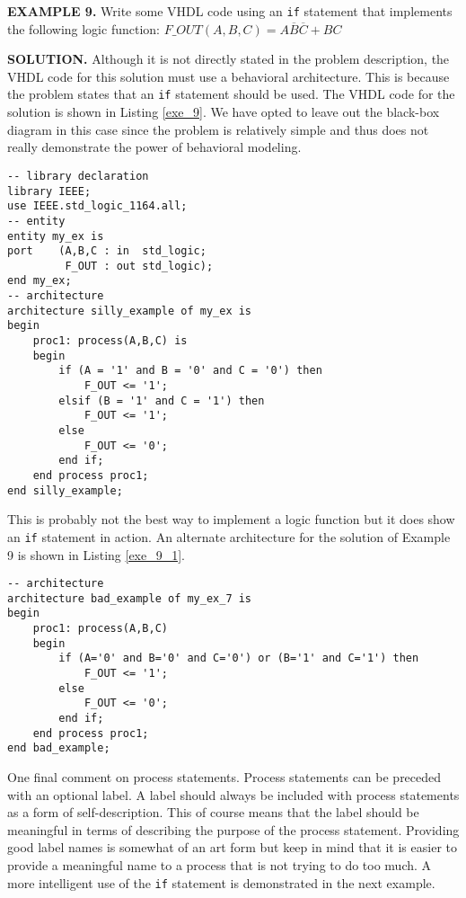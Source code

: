 \begin{leftbar}
\noindent
\textbf{EXAMPLE 9.}
Write some VHDL code  using an \texttt{if} statement that implements the following logic function: 
$F\_OUT(A,B,C)=A\overline{B}\overline{C}+BC$
\end{leftbar}
\noindent
\textbf{SOLUTION.} Although it is not directly stated in the problem description, the VHDL code for this solution must use a behavioral architecture. This is because the problem states that an \texttt{if} statement should be used. The VHDL code for the solution is shown in Listing \ref{exe_9}. We have opted to leave out the black-box diagram in this case since the problem is relatively simple and thus does not really demonstrate the power of behavioral modeling.

\noindent
\begin{minipage}{0.99\linewidth}
\begin{lstlisting}[label=exe_9, caption=Solution to Example 9.]
-- library declaration
library IEEE;
use IEEE.std_logic_1164.all;
-- entity
entity my_ex is
port 	(A,B,C : in  std_logic;
	 	 F_OUT : out std_logic);
end my_ex;
-- architecture
architecture silly_example of my_ex is
begin
	proc1: process(A,B,C) is
	begin
		if (A = '1' and B = '0' and C = '0') then
	   		F_OUT <= '1';
		elsif (B = '1' and C = '1') then
	   		F_OUT <= '1';
		else
	   		F_OUT <= '0';
		end if;
	end process proc1;
end silly_example;
\end{lstlisting}
\end{minipage}

This is probably not the best way to implement a logic function but it does show an \texttt{if} statement in action. An alternate architecture for the solution of Example 9 is shown in Listing \ref{exe_9_1}.

\noindent
\begin{minipage}{0.99\linewidth}
\begin{lstlisting}[label=exe_9_1, caption=Alternative solution to Example 9.]
-- architecture
architecture bad_example of my_ex_7 is
begin
	proc1: process(A,B,C)
	begin
		if (A='0' and B='0' and C='0') or (B='1' and C='1') then
	   		F_OUT <= '1';
		else
	   		F_OUT <= '0';
		end if;
	end process proc1;
end bad_example;
\end{lstlisting}
\end{minipage}

One final comment on process statements. Process statements can be preceded with an optional label. A label should always be included with process statements as a form of self-description. This of course means that the label should be meaningful in terms of describing the purpose of the process statement. Providing good label names is somewhat of an art form but keep in mind that it is easier to provide a meaningful name to a process that is not trying to do too much. A more intelligent use of the \texttt{if} statement is demonstrated in the next example.

